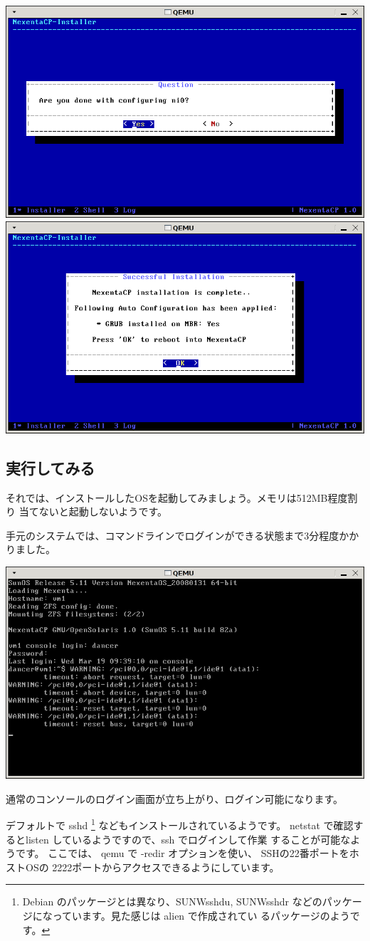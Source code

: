 \documentclass[mingoth,a4paper]{jsarticle}
\begin{document}
\includegraphics[width=0.5\hsize]{image200804/nexenta21.png}
\includegraphics[width=0.5\hsize]{image200804/nexenta22.png}

\subsection{実行してみる}

それでは、インストールしたOSを起動してみましょう。メモリは512MB程度割り
当てないと起動しないようです。


手元のシステムでは、コマンドラインでログインができる状態まで3分程度かかりました。

\includegraphics[width=0.5\hsize]{image200804/nexenta23.png}

通常のコンソールのログイン画面が立ち上がり、ログイン可能になります。

デフォルトで sshd \footnote{Debian のパッケージとは異なり、SUNWsshdu,
SUNWsshdr などのパッケージになっています。見た感じは alien で作成されてい
るパッケージのようです。} などもインストールされているようです。
netstat で確認するとlisten しているようですので、ssh でログインして作業
することが可能なようです。
ここでは、 qemu で -redir オプションを使い、 SSHの22番ポートをホストOSの
2222ポートからアクセスできるようにしています。
\end{document}
